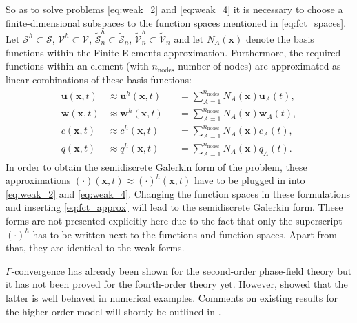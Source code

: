 So as to solve problems \eqref{eq:weak_2} and \eqref{eq:weak_4} it is necessary to choose a finite-dimensional subspaces to the function spaces mentioned in \eqref{eq:fct_spaces}. Let $\bm{\mathcal{S}}^{h}\subset\bm{\mathcal{S}}$, $\bm{\mathcal{V}}^{h}\subset\bm{\mathcal{V}}$, $\tilde{\mathcal{S}}_{n}^{h}\subset\tilde{\mathcal{S}}_{n}$, $\tilde{\mathcal{V}}_{n}^{h}\subset\tilde{\mathcal{V}}_{n}$ and let $N_{A}\left(\mathbf{x}\right)$ denote the basis functions within the Finite Elements approximation. Furthermore, the required functions within an element (with $n_{\text{nodes}}$ number of nodes) are approximated as linear combinations of these basis functions:
\begin{equation} \label{eq:fct_approx}
	\begin{aligned}
	\begin{alignedat}{2}
		\mathbf{u}\left(\mathbf{x},t\right) &\approx \mathbf{u}^{h}\left(\mathbf{x},t\right) &&= \sum\limits_{A=1}^{n_{\text{nodes}}}N_{A}\left(\mathbf{x}\right)\mathbf{u}_{A}\left(t\right), \\
		\mathbf{w}\left(\mathbf{x},t\right) &\approx \mathbf{w}^{h}\left(\mathbf{x},t\right) &&= \sum\limits_{A=1}^{n_{\text{nodes}}}N_{A}\left(\mathbf{x}\right)\mathbf{w}_{A}\left(t\right), \\
		c\left(\mathbf{x},t\right) &\approx c^{h}\left(\mathbf{x},t\right) &&= \sum\limits_{A=1}^{n_{\text{nodes}}}N_{A}\left(\mathbf{x}\right)c_{A}\left(t\right), \\
		q\left(\mathbf{x},t\right) &\approx q^{h}\left(\mathbf{x},t\right) &&= \sum\limits_{A=1}^{n_{\text{nodes}}}N_{A}\left(\mathbf{x}\right)q_{A}\left(t\right).
	\end{alignedat}
	\end{aligned}
\end{equation}
In order to obtain the semidiscrete Galerkin form of the problem, these approximations $\left(\cdot\right)\left(\mathbf{x},t\right)\approx\left(\cdot\right)^{h}\left(\mathbf{x},t\right)$ have to be plugged in into \eqref{eq:weak_2} and \eqref{eq:weak_4}. Changing the function spaces in these formulations and inserting \eqref{eq:fct_approx} will lead to the semidiscrete Galerkin form. These forms are not presented explicitly here due to the fact that only the superscript $\left(\cdot\right)^{h}$ has to be written next to the functions and function spaces. Apart from that, they are identical to the weak forms.

$\Gamma$-convergence has already been shown for the second-order phase-field theory but it has not been proved for the fourth-order theory yet. However, \citet{02_PF_HO_brittle} showed that the latter is well behaved in numerical examples. Comments on existing results for the higher-order model will shortly be outlined in .

